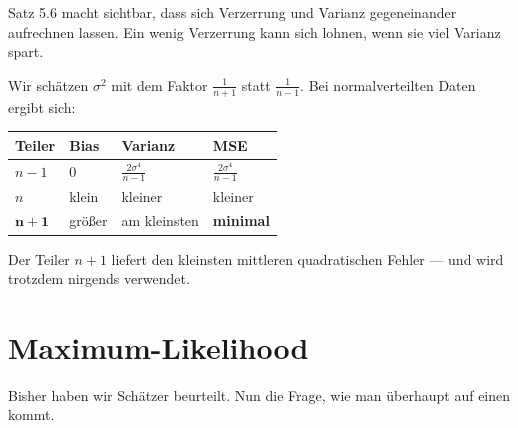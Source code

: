 \begin{merksatz}
Satz 5.6 macht sichtbar, dass sich Verzerrung und Varianz gegeneinander aufrechnen lassen. Ein wenig Verzerrung kann sich lohnen, wenn sie viel Varianz spart.

Wir schätzen $\sigma^2$ mit dem Faktor $\frac{1}{n+1}$ statt $\frac{1}{n-1}$. Bei normalverteilten Daten ergibt sich:

\begin{center}
{\small
\renewcommand{\arraystretch}{1.5}
\begin{tabular}{@{}P{2.4cm}P{2.2cm}P{2.2cm}P{1.6cm}@{}}
\toprule
\textbf{Teiler} & \textbf{Bias} & \textbf{Varianz} & \textbf{MSE}\\
\midrule
$n-1$ & $0$ & $\frac{2\sigma^4}{n-1}$ & $\frac{2\sigma^4}{n-1}$\\[3pt]
$n$ & klein & kleiner & kleiner\\[3pt]
$\mathbf{n+1}$ & \textcolor{akzent}{größer} & \textcolor{gruen}{am kleinsten} & \textcolor{gruen}{\textbf{minimal}}\\
\bottomrule
\end{tabular}}
\end{center}

Der Teiler $n+1$ liefert den kleinsten mittleren quadratischen Fehler --- und wird trotzdem nirgends verwendet.

\begin{center}
\begin{minipage}{0.88\textwidth}
\end{minipage}
\end{center}
\end{merksatz}

\section{Maximum-Likelihood}

Bisher haben wir Schätzer beurteilt. Nun die Frage, wie man überhaupt auf einen kommt.

